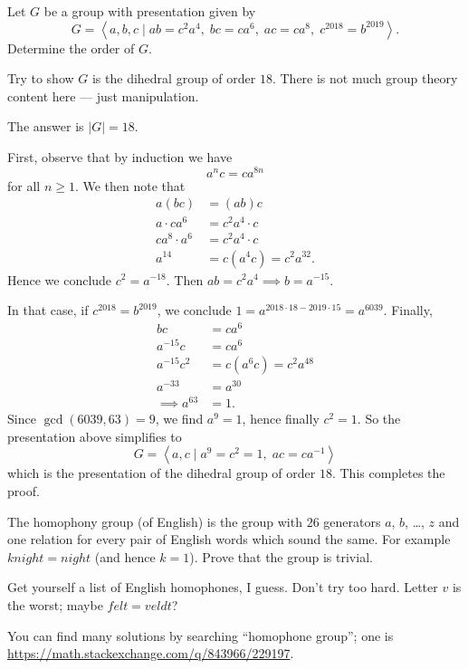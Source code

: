 \begin{problem}
	\yod
	Let $G$ be a group with presentation given by
	\[ G = \left< a,b,c \mid
		ab = c^2a^4, \; bc = ca^6, \; ac = ca^8, \;
		c^{2018} = b^{2019}
		\right>. \]
	Determine the order of $G$.
	\begin{hint}
		Try to show $G$ is the dihedral group of order $18$.
		There is not much group theory content here --- just manipulation.
	\end{hint}
	\begin{sol}
		The answer is $|G| = 18$.

		First, observe that by induction we have
		\[ a^n c = ca^{8n} \]
		for all $n \ge 1$.
		We then note that
		\begin{align*}
			a(bc) &= (ab)c \\
			a \cdot ca^6 &= c^2 a^4 \cdot c \\
			c a^8 \cdot a^6 &= c^2 a^4 \cdot c \\
			a^{14} &= c(a^4c) = c^2 a^{32}.
		\end{align*}
		Hence we conclude $c^2 = a^{-18}$.
		Then $ab = c^2a^4 \implies b = a^{-15}$.

		In that case, if $c^{2018} = b^{2019}$,
		we conclude $1 = a^{2018 \cdot 18 - 2019 \cdot 15} = a^{6039}$.
		Finally, 
		\begin{align*}
			bc &= ca^6 \\
			a^{-15} c &= ca^6 \\
			a^{-15} c^2 &= c(a^6c) = c^2 a^{48} \\
			a^{-33} &= a^{30} \\
			\implies a^{63} &= 1.
		\end{align*}
		Since $\gcd(6039, 63) = 9$, we find $a^9 = 1$, hence finally $c^2 = 1$.
		So the presentation above simplifies to
		\[ G = \left< a,c \mid a^9=c^2=1, \; ac = ca^{-1} \right> \]
		which is the presentation of the dihedral group of order $18$.
		This completes the proof.
	\end{sol}
\end{problem}

\begin{problem}
	\gim
    The homophony group (of English) is the group
	with $26$ generators $a$, $b$, \dots, $z$
	and one relation for every pair of English words
	which sound the same.
	For example $knight = night$ (and hence $k=1$).
	Prove that the group is trivial.
	\begin{hint}
		Get yourself a list of English homophones, I guess.
		Don't try too hard.
		Letter $v$ is the worst; maybe $felt = veldt$?
	\end{hint}
	\begin{sol}
		You can find many solutions by searching ``homophone group'';
		one is \url{https://math.stackexchange.com/q/843966/229197}.
	\end{sol}
\end{problem}
